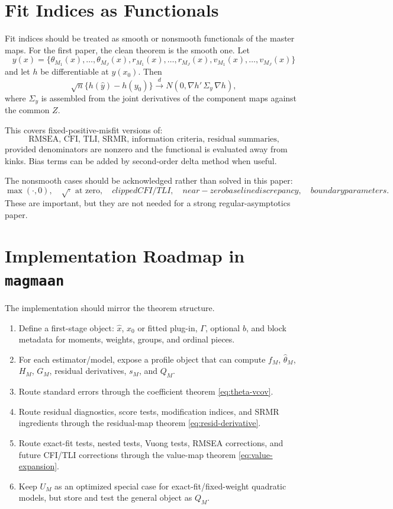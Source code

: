 \documentclass[11pt]{article}
\newcommand{\dto}{\xrightarrow{d}}
\theoremstyle{plain}
\theoremstyle{remark}
\begin{document}
\section{Fit Indices as Functionals}

Fit indices should be treated as smooth or nonsmooth functionals of the master
maps. For the first paper, the clean theorem is the smooth one. Let
\[
  y(x)=\{\theta_{M_1}(x),\ldots,\theta_{M_J}(x),
        r_{M_1}(x),\ldots,r_{M_J}(x),
        v_{M_1}(x),\ldots,v_{M_J}(x)\}
\]
and let $h$ be differentiable at $y(x_0)$. Then
\[
  \sqrt n\{h(\hat y)-h(y_0)\}
  \dto
  N(0,\nabla h'\,\Sigma_y\,\nabla h),
\]
where $\Sigma_y$ is assembled from the joint derivatives of the component maps
against the common $Z$.

This covers fixed-positive-misfit versions of:
\[
  \text{RMSEA, CFI, TLI, SRMR, information criteria, residual summaries,}
\]
provided denominators are nonzero and the functional is evaluated away from
kinks. Bias terms can be added by second-order delta method when useful.

The nonsmooth cases should be acknowledged rather than solved in this paper:
\[
  \max(\cdot,0),\quad \sqrt{\cdot}\text{ at zero},\quad clipped CFI/TLI,\quad
  near-zero baseline discrepancy,\quad boundary parameters.
\]
These are important, but they are not needed for a strong regular-asymptotics
paper.

\section{Implementation Roadmap in \texttt{magmaan}}

The implementation should mirror the theorem structure.

\begin{enumerate}
\item Define a first-stage object: $\hat x$, $x_0$ or fitted plug-in,
  $\Gamma$, optional $b$, and block metadata for moments, weights, groups, and
  ordinal pieces.
\item For each estimator/model, expose a profile object that can compute
  $f_M$, $\hat\theta_M$, $H_M$, $G_M$, residual derivatives, $s_M$, and $Q_M$.
\item Route standard errors through the coefficient theorem
  \eqref{eq:theta-vcov}.
\item Route residual diagnostics, score tests, modification indices, and SRMR
  ingredients through the residual-map theorem \eqref{eq:resid-derivative}.
\item Route exact-fit tests, nested tests, Vuong tests, RMSEA corrections, and
  future CFI/TLI corrections through the value-map theorem
  \eqref{eq:value-expansion}.
\item Keep $U_M$ as an optimized special case for exact-fit/fixed-weight
  quadratic models, but store and test the general object as $Q_M$.
\end{enumerate}
\end{document}
